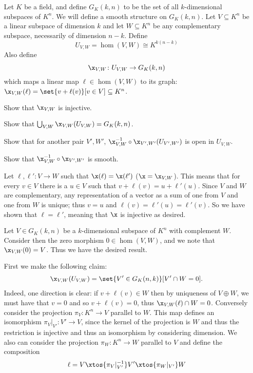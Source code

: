    Let $K$ be a field, and define $G_K(k,n)$ to be the set of all $k$-dimensional subspaces of $K^n$.
    We will define a smooth structure on $G_K(k,n)$.
    Let $V\subseteq K^n$ be a linear subspace of dimension $k$ and let $W\subseteq K^n$ be any complementary
    subspace, necessarily of dimension $n-k$.
    Define
    $$ U_{V,W} = \hom(V,W) \cong K^{k(n-k)} $$
    Also define
    $$ \x_{V,W}\colon U_{V,W}\to G_K(k,n) $$
    which maps a linear map $\ell\in\hom(V,W)$ to its graph:
    $\x_{V,W}(\ell)=\set{v+\ell(v)}[v\in V]\subseteq K^n$.
    \benum
        \item Show that $\x_{V,W}$ is injective.
        \item Show that $\bigcup_{V,W}\x_{V,W}(U_{V,W})=G_K(k,n)$.
        \item Show that for another pair $V',W'$, $\x^{-1}_{V,W}\circ\x_{V',W'}(U_{V',W'})$ is open in
        $U_{V,W}$.
        \item Show that $\x^{-1}_{V,W}\circ\x_{V',W'}$ is smooth.
    \eenum

\eprob

\benum
    \item Let $\ell,\ell'\colon V\to W$ such that $\x(\ell)=\x(\ell')$ ($\x=\x_{V,W}$).
    This means that for every $v\in V$ there is a $u\in V$ such that $v+\ell(v)=u+\ell'(u)$.
    Since $V$ and $W$ are complementary, any representation of a vector as a sum of one from $V$ and one from
    $W$ is unique; thus $v=u$ and $\ell(v)=\ell'(u)=\ell'(v)$.
    So we have shown that $\ell=\ell'$, meaning that $\x$ is injective as desired.

    \item Let $V\in G_K(k,n)$ be a $k$-dimensional subspace of $K^n$ with complement $W$.
    Consider then the zero morphism $0\in\hom(V,W)$, and we note that $\x_{V,W}(0)=V$.
    Thus we have the desired result.

    \item First we make the following claim:
    $$ \x_{V,W}(U_{V,W}) = \set{V'\in G_K(n,k)}[V'\cap W=0] . $$
    Indeed, one direction is clear: if $v+\ell(v)\in W$ then by uniqueness of $V\oplus W$, we must have that
    $v=0$ and so $v+\ell(v)=0$, thus $\x_{V,W}(\ell)\cap W=0$.
    Conversely consider the projection $\pi_V\colon K^n\to V$ parallel to $W$.
    This map defines an isomorphism $\pi_V|_{V'}\colon V'\to V$, since the kernel of the projection is $W$
    and thus the restriction is injective and thus an isomorphism by considering dimension.
    We also can consider the projection $\pi_W\colon K^n\to W$ parallel to $V$ and define the composition
    $$ \ell = V \xtos{\pi_V|_{V'}^{-1}} V' \xtos{\pi_W|_{V'}} W $$

